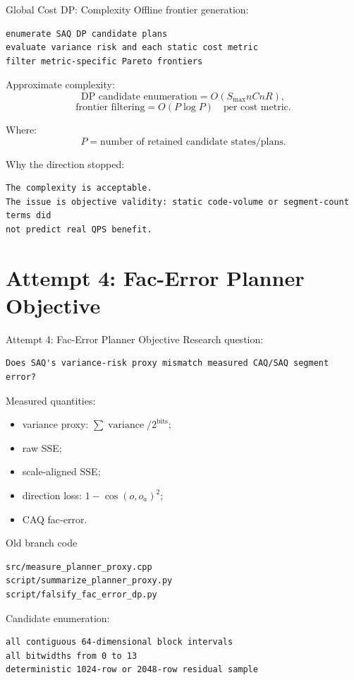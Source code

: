\documentclass[aspectratio=169,10pt]{beamer}
\begin{document}
\begin{frame}[fragile]{Global Cost DP: Complexity}
\small
Offline frontier generation:
\begin{lstlisting}
enumerate SAQ DP candidate plans
evaluate variance risk and each static cost metric
filter metric-specific Pareto frontiers
\end{lstlisting}

Approximate complexity:
\[
\text{DP candidate enumeration}=O(S_{\max} n C n R),
\]
\[
\text{frontier filtering}=O(P\log P)\quad\text{per cost metric}.
\]

Where:
\[
P = \text{number of retained candidate states/plans}.
\]

\vspace{0.8em}
Why the direction stopped:
\begin{lstlisting}
The complexity is acceptable.
The issue is objective validity: static code-volume or segment-count terms did
not predict real QPS benefit.
\end{lstlisting}
\end{frame}

\section{Attempt 4: Fac-Error Planner Objective}

\begin{frame}[fragile]{Attempt 4: Fac-Error Planner Objective}
\small
Research question:
\begin{lstlisting}
Does SAQ's variance-risk proxy mismatch measured CAQ/SAQ segment error?
\end{lstlisting}

Measured quantities:
\begin{itemize}
  \item variance proxy: \(\sum \operatorname{variance}/2^{\text{bits}}\);
  \item raw SSE;
  \item scale-aligned SSE;
  \item direction loss: \(1-\cos(o,o_a)^2\);
  \item CAQ fac-error.
\end{itemize}

\begin{block}{Old branch code}
\begin{lstlisting}
src/measure_planner_proxy.cpp
script/summarize_planner_proxy.py
script/falsify_fac_error_dp.py
\end{lstlisting}
\end{block}

Candidate enumeration:
\begin{lstlisting}
all contiguous 64-dimensional block intervals
all bitwidths from 0 to 13
deterministic 1024-row or 2048-row residual sample
\end{lstlisting}
\end{frame}
\end{document}
